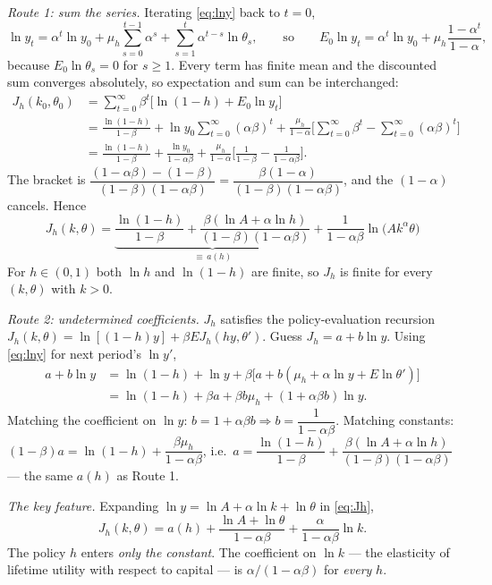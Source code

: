 \documentclass[12pt, letterpaper]{article}
\begin{document}
\begin{tcolorbox}[oddbox,title={Exercise 3.1 \quad Howard's policy iteration algorithm}]
\emph{Route 1: sum the series.} Iterating \eqref{eq:lny} back to $t=0$,
\[
\ln y_t=\alpha^t\ln y_0+\mu_h\sum_{s=0}^{t-1}\alpha^s+\sum_{s=1}^{t}\alpha^{t-s}\ln\theta_s,
\qquad\text{so}\qquad
E_0\ln y_t=\alpha^t\ln y_0+\mu_h\frac{1-\alpha^t}{1-\alpha},
\]
because $E_0\ln\theta_s=0$ for $s\ge1$. Every term has finite mean and the discounted sum
converges absolutely, so expectation and sum can be interchanged:
\begin{align*}
J_h(k_0,\theta_0)&=\sum_{t=0}^\infty\beta^t\big[\ln(1-h)+E_0\ln y_t\big]\\
&=\frac{\ln(1-h)}{1-\beta}+\ln y_0\sum_{t=0}^\infty(\alpha\beta)^t
+\frac{\mu_h}{1-\alpha}\Big[\sum_{t=0}^\infty\beta^t-\sum_{t=0}^\infty(\alpha\beta)^t\Big]\\
&=\frac{\ln(1-h)}{1-\beta}+\frac{\ln y_0}{1-\alpha\beta}
+\frac{\mu_h}{1-\alpha}\Big[\frac{1}{1-\beta}-\frac{1}{1-\alpha\beta}\Big].
\end{align*}
The bracket is
$\dfrac{(1-\alpha\beta)-(1-\beta)}{(1-\beta)(1-\alpha\beta)}=\dfrac{\beta(1-\alpha)}{(1-\beta)(1-\alpha\beta)}$,
and the $(1-\alpha)$ cancels. Hence
\begin{equation}
\boxed{J_h(k,\theta)=\underbrace{\frac{\ln(1-h)}{1-\beta}
+\frac{\beta(\ln A+\alpha\ln h)}{(1-\beta)(1-\alpha\beta)}}_{\equiv\,a(h)}
+\frac{1}{1-\alpha\beta}\ln\big(Ak^\alpha\theta\big)}
\label{eq:Jh}
\end{equation}
For $h\in(0,1)$ both $\ln h$ and $\ln(1-h)$ are finite, so $J_h$ is finite for every
$(k,\theta)$ with $k>0$.

\emph{Route 2: undetermined coefficients.} $J_h$ satisfies the policy-evaluation recursion
$J_h(k,\theta)=\ln[(1-h)y]+\beta EJ_h(hy,\theta')$. Guess $J_h=a+b\ln y$. Using
\eqref{eq:lny} for next period's $\ln y'$,
\begin{align*}
a+b\ln y&=\ln(1-h)+\ln y+\beta\big[a+b(\mu_h+\alpha\ln y+E\ln\theta')\big]\\
&=\ln(1-h)+\beta a+\beta b\mu_h+(1+\alpha\beta b)\ln y .
\end{align*}
Matching the coefficient on $\ln y$: $b=1+\alpha\beta b\Rightarrow b=\dfrac{1}{1-\alpha\beta}$.
Matching constants: $(1-\beta)a=\ln(1-h)+\dfrac{\beta\mu_h}{1-\alpha\beta}$, i.e.\
$a=\dfrac{\ln(1-h)}{1-\beta}+\dfrac{\beta(\ln A+\alpha\ln h)}{(1-\beta)(1-\alpha\beta)}$ ---
the same $a(h)$ as Route 1. \checkmark

\emph{The key feature.} Expanding $\ln y=\ln A+\alpha\ln k+\ln\theta$ in \eqref{eq:Jh},
\begin{equation}
J_h(k,\theta)=a(h)+\frac{\ln A+\ln\theta}{1-\alpha\beta}+\frac{\alpha}{1-\alpha\beta}\ln k .
\label{eq:Jk}
\end{equation}
The policy $h$ enters \emph{only the constant}. The coefficient on $\ln k$ ---
the elasticity of lifetime utility with respect to capital --- is $\alpha/(1-\alpha\beta)$ for
\emph{every} $h$.


\end{tcolorbox}
\end{document}
